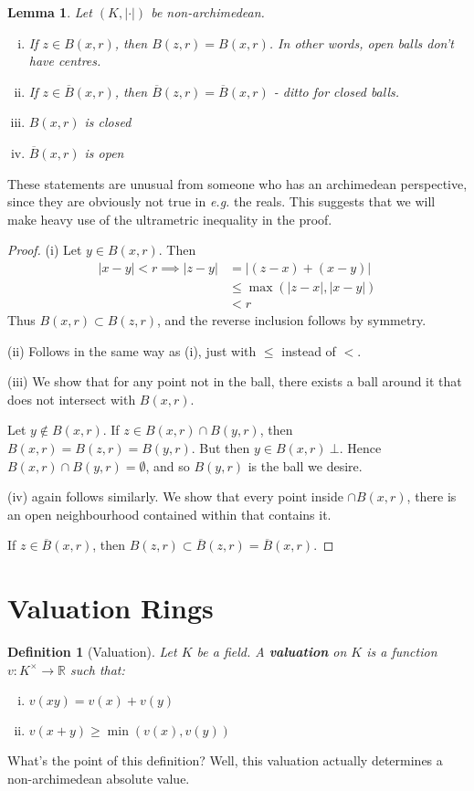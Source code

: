 \documentclass[]{article}
\theoremstyle{custhm}
\theoremstyle{cusdef}
\newtheorem{defin}[theorem]{Definition}
\theoremstyle{custhm}
\newtheorem{lemma}[theorem]{Lemma}
\theoremstyle{custhm}
\theoremstyle{custhm}
\theoremstyle{custhm}
\theoremstyle{cusdef}
\theoremstyle{remark}
\newcommand{\R}{\mathbb{R}}
\newcommand{\ra}{\rightarrow}
\newcommand{\undf}[1]{\textit{\textbf{#1}}}
\renewcommand{\it}[1]{\textit{#1}}
\newcommand{\val}[1]{\left|#1\right|}
\newcommand{\valk}{(K,|\cdot|)}
\renewcommand{\bar}{\overline}
\begin{document}
\begin{lemma}
	Let $\valk$ be non-archimedean.
	\begin{enumerate}[(i)]
		\item If $z\in B(x,r)$, then $B(z,r) = B(x,r)$. In other words, open balls don't have centres.
		\item If $z\in \bar{B}(x,r)$, then $\bar{B}(z,r) = \bar{B}(x,r)$ - ditto for closed balls.
		\item $B(x,r)$ is closed
		\item $\bar{B}(x,r)$ is open
	\end{enumerate}
\end{lemma}
These statements are unusual from someone who has an archimedean perspective, since they are obviously not true in \it{e.g.} the reals. This suggests that we will make heavy use of the ultrametric inequality in the proof.
\begin{proof}
(i) Let $y\in B(x,r)$. Then
\begin{align*}
	\val{x-y} < r\implies \val{z-y} &= \val{(z-x) + (x-y)}\\
	&\le \max(|z-x|,|x-y|)\\
	&< r
\end{align*}
Thus $B(x,r)\subset B(z,r)$, and the reverse inclusion follows by symmetry.

(ii) Follows in the same way as (i), just with $\le$ instead of $<$.

(iii) We show that for any point not in the ball, there exists a ball around it that does not intersect with $B(x,r)$.

Let $y\not\in B(x,r)$. If $z\in B(x,r)\cap B(y,r)$, then $B(x,r) = B(z,r) = B(y,r)$. But then $y\in B(x,r)\ \bot$. Hence $B(x,r)\cap B(y,r) = \emptyset$, and so $B(y,r)$ is the ball we desire.

(iv) again follows similarly. We show that every point inside $\cap{B}(x,r)$, there is an open neighbourhood contained within that contains it.

If $z\in \bar{B}(x,r)$, then $B(z,r) \subset \bar{B}(z,r) = \bar{B}(x,r)$.
\end{proof}

\section{Valuation Rings}

\begin{defin}[Valuation]
	Let $K$ be a field. A \undf{valuation} on $K$ is a function $v:K^\times \ra \R$ such that:
	\begin{enumerate}[(i)]
		\item $v(xy) = v(x) + v(y)$
		\item $v(x+y) \ge \min(v(x),v(y))$
	\end{enumerate}
\end{defin}
What's the point of this definition? Well, this valuation actually determines a non-archimedean absolute value.
\end{document}
